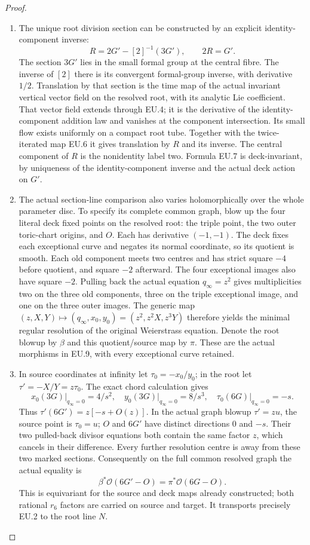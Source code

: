 \begin{proof}
\begin{enumerate}[label=\arabic*.]
\item The unique root division section can be constructed by an explicit
identity-component inverse:
\[
             R=2G'-[2]^{-1}(3G'),\qquad 2R=G'.
 \tag{EU.7}
\]
The section \(3G'\) lies in the small formal group at the central
fibre. The inverse of \([2]\) there is its convergent formal-group
inverse, with derivative \(1/2\). Translation by that section is
the time map of the actual invariant vertical vector field on the
resolved root, with its analytic Lie coefficient. That vector field
extends through EU.4; it is the derivative of the identity-component
addition law and vanishes at the component intersection. Its small
flow exists uniformly on a compact root tube. Together with the
twice-iterated map EU.6 it gives translation by \(R\) and its inverse.
The central component of \(R\) is the nonidentity label two. Formula
EU.7 is deck-invariant, by uniqueness of the identity-component
inverse and the actual deck action on \(G'\).

\item The actual section-line comparison also varies holomorphically over
the whole parameter disc. To specify its complete common graph,
blow up the four literal deck fixed points on the resolved root:
the triple point, the two outer toric-chart origins, and \(O\).
Each has derivative \((-1,-1)\). The deck fixes each exceptional
curve and negates its normal coordinate, so its quotient is smooth.
Each old component meets two centres and has strict square \(-4\)
before quotient, and square \(-2\) afterward. The four exceptional
images also have square \(-2\). Pulling back the actual equation
\(q_\infty=z^2\) gives multiplicities two on the three old
components, three on the triple exceptional image, and one on the
three outer images. The generic map
\((z,X,Y)\mapsto(q_\infty,x_0,y_0)=(z^2,z^2X,z^3Y)\)
therefore yields the minimal regular resolution of the original
Weierstrass equation. Denote the root blowup by \(\beta\) and this
quotient/source map by \(\pi\). These are the actual morphisms
in EU.9, with every exceptional curve retained.

\item In source coordinates at infinity let
\(\tau_0=-x_0/y_0\); in the root let \(\tau'=-X/Y=z\tau_0\).
The exact chord calculation gives
\[
 x_0(3G)\big|_{q_\infty=0}=4/s^2,\quad
 y_0(3G)\big|_{q_\infty=0}=8/s^3,\quad
 \tau_0(6G)\big|_{q_\infty=0}=-s.
 \tag{EU.8}
\]
Thus \(\tau'(6G')=z[-s+O(z)]\). In the actual graph blowup
\(\tau'=z u\), the source point is \(\tau_0=u\); \(O\) and
\(6G'\) have distinct directions \(0\) and \(-s\). Their two
pulled-back divisor equations both contain the same factor \(z\),
which cancels in their difference. Every further resolution centre
is away from these two marked sections. Consequently on the full
common resolved graph the actual equality is
\[
       \beta^*\mathcal O(6G'-O)=\pi^*\mathcal O(6G-O).
 \tag{EU.9}
\]
This is equivariant for the source and deck maps already constructed;
both rational \(r_6\) factors are carried on source and target. It
transports precisely EU.2 to the root line \(N\).


\end{enumerate}
\end{proof}
